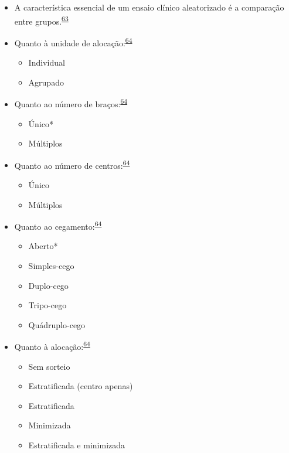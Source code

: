\documentclass[
]{book}
\begin{document}
\begin{itemize}
\item
  A característica essencial de um ensaio clínico aleatorizado é a comparação entre grupos.\textsuperscript{\protect\hyperlink{ref-bland2011}{63}}
\item
  Quanto à unidade de alocação:\textsuperscript{\protect\hyperlink{ref-Bruce2022}{64}}

  \begin{itemize}
  \item
    Individual
  \item
    Agrupado
  \end{itemize}
\item
  Quanto ao número de braços:\textsuperscript{\protect\hyperlink{ref-Bruce2022}{64}}

  \begin{itemize}
  \item
    Único*
  \item
    Múltiplos
  \end{itemize}
\item
  Quanto ao número de centros:\textsuperscript{\protect\hyperlink{ref-Bruce2022}{64}}

  \begin{itemize}
  \item
    Único
  \item
    Múltiplos
  \end{itemize}
\item
  Quanto ao cegamento:\textsuperscript{\protect\hyperlink{ref-Bruce2022}{64}}

  \begin{itemize}
  \item
    Aberto*
  \item
    Simples-cego
  \item
    Duplo-cego
  \item
    Tripo-cego
  \item
    Quádruplo-cego
  \end{itemize}
\item
  Quanto à alocação:\textsuperscript{\protect\hyperlink{ref-Bruce2022}{64}}

  \begin{itemize}
  \item
    Sem sorteio
  \item
    Estratificada (centro apenas)
  \item
    Estratificada
  \item
    Minimizada
  \item
    Estratificada e minimizada
  \end{itemize}
\end{itemize}
\end{document}
